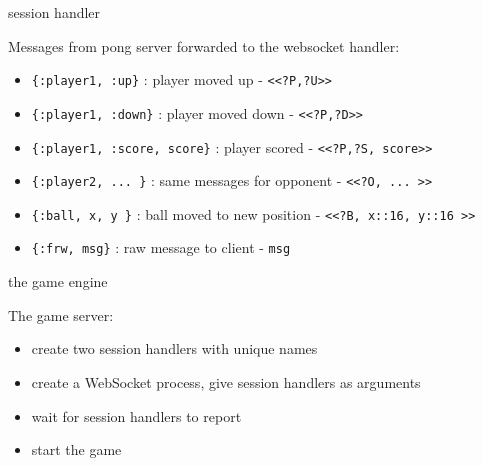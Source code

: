 \begin{frame}{session handler}

  Messages from pong server forwarded to the websocket handler:

  \vspace{20pt}
      
  \begin{itemize}
  \item {\tt \{:player1, :up\}}  : player moved up -  {\tt <<?P,?U>>}
  \item {\tt \{:player1, :down\}}  : player moved down - {\tt <<?P,?D>>}
  \item {\tt \{:player1, :score, score\}}  : player scored - {\tt <<?P,?S, score>>}
  \item {\tt \{:player2, ... \}} : same messages for opponent -  {\tt <<?O, ... >>}        
  \item {\tt \{:ball, x, y \}} : ball moved to new position - {\tt <<?B, x::16, y::16 >>}        
  \item {\tt \{:frw, msg\}}  : raw message to client - {\tt msg}
  \end{itemize}
\end{frame}

\begin{frame}{the game engine}

  The game server:
  \vspace{10pt} \pause
  \begin{itemize}
  \item create two session handlers with unique names \pause
  \item create a WebSocket process, give session handlers as arguments \pause
  \item wait for session handlers to report \pause
  \item start the game \pause
  \end{itemize}
  
\end{frame}


